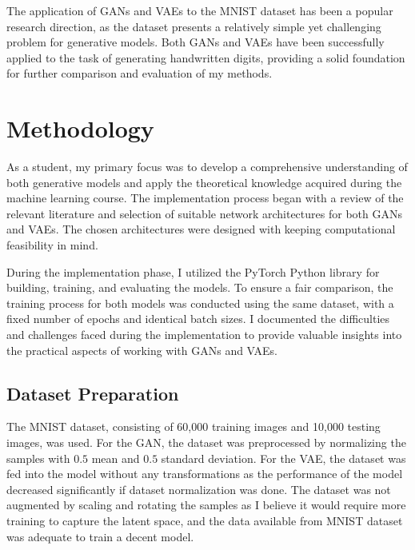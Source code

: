 \documentclass{article}
\begin{document}
The application of GANs and VAEs to the MNIST dataset has been a popular research direction, as the dataset presents a relatively simple yet challenging problem for generative models. Both GANs and VAEs have been successfully applied to the task of generating handwritten digits, providing a solid foundation for further comparison and evaluation of my methods.

\section{Methodology}
As a student, my primary focus was to develop a comprehensive understanding of both generative models and apply the theoretical knowledge acquired during the machine learning course. The implementation process began with a review of the relevant literature and selection of suitable network architectures for both GANs and VAEs. The chosen architectures were designed with keeping computational feasibility in mind.

During the implementation phase, I utilized the PyTorch Python library for building, training, and evaluating the models. To ensure a fair comparison, the training process for both models was conducted using the same dataset, with a fixed number of epochs and identical batch sizes. I documented the difficulties and challenges faced during the implementation to provide valuable insights into the practical aspects of working with GANs and VAEs.

\subsection{Dataset Preparation}
The MNIST dataset, consisting of 60,000 training images and 10,000 testing images, was used. For the GAN, the dataset was preprocessed by normalizing the samples with $0.5$ mean and $0.5$ standard deviation. For the VAE, the dataset was fed into the model without any transformations as the performance of the model decreased significantly if dataset normalization was done. The dataset was not augmented by scaling and rotating the samples as I believe it would require more training to capture the latent space, and the data available from MNIST dataset was adequate to train a decent model.
\end{document}
